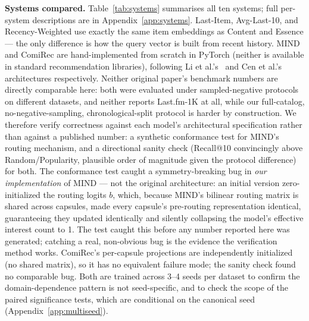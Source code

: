 \documentclass{article}
\begin{document}
\textbf{Systems compared.} Table~\ref{tab:systems} summarises all ten systems; full per-system descriptions are in Appendix~\ref{app:systems}. Last-Item, Avg-Last-10, and Recency-Weighted use exactly the same item embeddings as Content and Essence --- the only difference is how the query vector is built from recent history. MIND and ComiRec are hand-implemented from scratch in PyTorch (neither is available in standard recommendation libraries), following Li et al.'s~\cite{li2019} and Cen et al.'s~\cite{cen2020} architectures respectively. Neither original paper's benchmark numbers are directly comparable here: both were evaluated under sampled-negative protocols on different datasets, and neither reports Last.fm-1K at all, while our full-catalog, no-negative-sampling, chronological-split protocol is harder by construction. We therefore verify correctness against each model's architectural specification rather than against a published number: a synthetic conformance test for MIND's routing mechanism, and a directional sanity check (Recall@10 convincingly above Random/Popularity, plausible order of magnitude given the protocol difference) for both. The conformance test caught a symmetry-breaking bug in \emph{our implementation} of MIND --- not the original architecture: an initial version zero-initialized the routing logits $b$, which, because MIND's bilinear routing matrix is shared across capsules, made every capsule's pre-routing representation identical, guaranteeing they updated identically and silently collapsing the model's effective interest count to 1. The test caught this before any number reported here was generated; catching a real, non-obvious bug is the evidence the verification method works. ComiRec's per-capsule projections are independently initialized (no shared matrix), so it has no equivalent failure mode; the sanity check found no comparable bug. Both are trained across 3--4 seeds per dataset to confirm the domain-dependence pattern is not seed-specific, and to check the scope of the paired significance tests, which are conditional on the canonical seed (Appendix~\ref{app:multiseed}).
\end{document}
